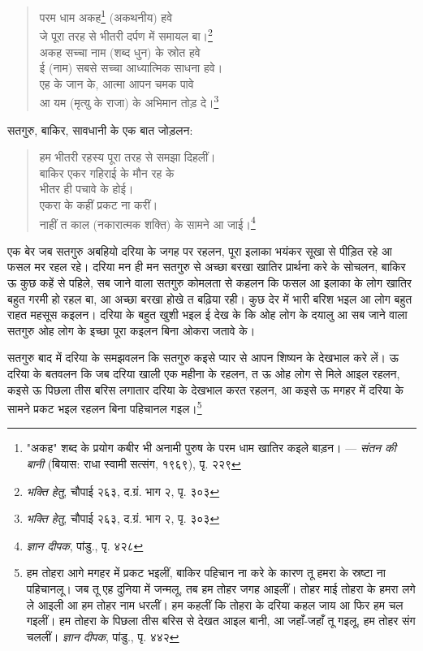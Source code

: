 \begin{quote}
परम धाम अकह\footnote{"अकह" शब्द के प्रयोग कबीर भी अनामी पुरुष के परम धाम खातिर कइले बाड़न। — \textit{संतन की बानी} (बियास: राधा स्वामी सत्संग, १९६९), पृ. २२९} (अकथनीय) हवे \\
जे पूरा तरह से भीतरी दर्पण में समायल बा।\footnote{\textit{भक्ति हेतु}, चौपाई २६३, द.ग्रं. भाग २, पृ. ३०३} \\
अकह सच्चा नाम (शब्द धुन) के स्रोत हवे \\
ई (नाम) सबसे सच्चा आध्यात्मिक साधना हवे। \\
एह के जान के, आत्मा आपन चमक पावे \\
आ यम (मृत्यु के राजा) के अभिमान तोड़ दे।\footnote{\textit{भक्ति हेतु}, चौपाई २६३, द.ग्रं. भाग २, पृ. ३०३}
\end{quote}

सतगुरु, बाकिर, सावधानी के एक बात जोड़लन:

\begin{quote}
हम भीतरी रहस्य पूरा तरह से समझा दिहलीं। \\
बाकिर एकर गहिराई के मौन रह के \\
भीतर ही पचावे के होई। \\
एकरा के कहीं प्रकट ना करीं। \\
नाहीं त काल (नकारात्मक शक्ति) के सामने आ जाई।\footnote{\textit{ज्ञान दीपक}, पांडु., पृ. ४२८}
\end{quote}

एक बेर जब सतगुरु अबहियो दरिया के जगह पर रहलन, पूरा इलाका भयंकर सूखा से पीड़ित रहे आ फसल मर रहल रहे। दरिया मन ही मन सतगुरु से अच्छा बरखा खातिर प्रार्थना करे के सोचलन, बाकिर ऊ कुछ कहें से पहिले, सब जाने वाला सतगुरु कोमलता से कहलन कि फसल आ इलाका के लोग खातिर बहुत गरमी हो रहल बा, आ अच्छा बरखा होखे त बढ़िया रही। कुछ देर में भारी बरिश भइल आ लोग बहुत राहत महसूस कइलन। दरिया के बहुत खुशी भइल ई देख के कि ओह लोग के दयालु आ सब जाने वाला सतगुरु ओह लोग के इच्छा पूरा कइलन बिना ओकरा जतावे के।

सतगुरु बाद में दरिया के समझवलन कि सतगुरु कइसे प्यार से आपन शिष्यन के देखभाल करे लें। ऊ दरिया के बतवलन कि जब दरिया खाली एक महीना के रहलन, त ऊ ओह लोग से मिले आइल रहलन, कइसे ऊ पिछला तीस बरिस लगातार दरिया के देखभाल करत रहलन, आ कइसे ऊ मगहर में दरिया के सामने प्रकट भइल रहलन बिना पहिचानल गइल।\footnote{हम तोहरा आगे मगहर में प्रकट भइलीं, बाकिर पहिचान ना करे के कारण तू हमरा के स्रष्टा ना पहिचानलू। जब तू एह दुनिया में जन्मलू, तब हम तोहर जगह आइलीं। तोहर माई तोहरा के हमरा लगे ले आइली आ हम तोहर नाम धरलीं। हम कहलीं कि तोहरा के दरिया कहल जाय आ फिर हम चल गइलीं। हम तोहरा के पिछला तीस बरिस से देखत आइल बानी, आ जहाँ-जहाँ तू गइलू, हम तोहर संग चललीं। \textit{ज्ञान दीपक}, पांडु., पृ. ४४२}

